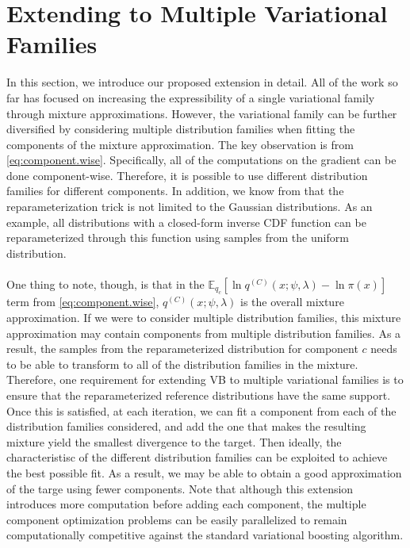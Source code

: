 

\section{Extending to Multiple Variational Families} \label{sec:extension}
In this section, we introduce our proposed extension in detail. All of the work so far has focused on increasing the expressibility of a single variational family through mixture approximations. However, the variational family can be further diversified by considering multiple distribution families when fitting the components of the mixture approximation. The key observation is from \cref{eq:component.wise}. Specifically, all of the computations on the gradient can be done component-wise. Therefore, it is possible to use different distribution families for different components. In addition, we know from \cite{kingma2013auto} that the reparameterization trick is not limited to the Gaussian distributions. As an example, all distributions with a closed-form inverse CDF function can be reparameterized through this function using samples from the uniform distribution.\\\\
One thing to note, though, is that in the $\mathbb{E}_{q_c} \left[ \ln q^{(C)}(x;\psi,\lambda) - \ln\pi(x) \right]$ term from \cref{eq:component.wise}, $q^{(C)}(x;\psi,\lambda)$ is the overall mixture approximation. If we were to consider multiple distribution families, this mixture approximation may contain components from multiple distribution families. As a result, the samples from the reparameterized distribution for component $c$ needs to be able to transform to all of the distribution families in the mixture. Therefore, one requirement for extending VB to multiple variational families is to ensure that the reparameterized reference distributions have the same support. Once this is satisfied, at each iteration, we can fit a component from each of the distribution families considered, and add the one that makes the resulting mixture yield the smallest divergence to the target. Then ideally, the characteristisc of the different distribution families can be exploited to achieve the best possible fit. As a result, we may be able to obtain a good approximation of the targe using fewer components. Note that although this extension introduces more computation before adding each component, the multiple component optimization problems can be easily parallelized to remain computationally competitive against the standard variational boosting algorithm.
